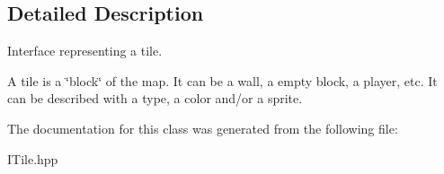 \subsection{Detailed Description}
Interface representing a tile. 

A tile is a \char`\"{}block\char`\"{} of the map. It can be a wall, a empty block, a player, etc. It can be described with a type, a color and/or a sprite. 

The documentation for this class was generated from the following file\+:\begin{DoxyCompactItemize}
\item 
I\+Tile.\+hpp\end{DoxyCompactItemize}
